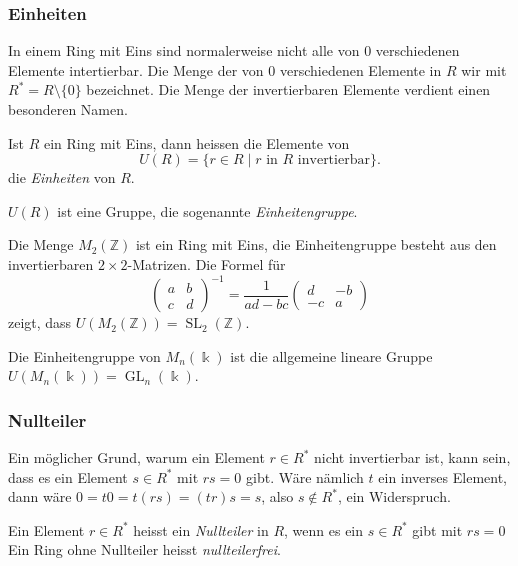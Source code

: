 \subsubsection{Einheiten}
In einem Ring mit Eins sind normalerweise nicht alle von $0$ verschiedenen
Elemente intertierbar.
Die Menge der von $0$ verschiedenen Elemente in $R$ wir mit $R^*=R\setminus\{0\}$
bezeichnet.
%
Die Menge der invertierbaren Elemente verdient einen besonderen Namen.

\begin{definition}
Ist $R$ ein Ring mit Eins, dann heissen die Elemente von
\[
U(R) = \{ r\in R \;|\; \text{$r$ in $R$ invertierbar}\}.
\]
die {\em Einheiten} von $R$.
%
\end{definition}

\begin{satz}
$U(R)$ ist eine Gruppe, die sogenannte {\em Einheitengruppe}.
%
\end{satz}

\begin{beispiel}
Die Menge $M_2(\mathbb{Z})$ ist ein Ring mit Eins, die Einheitengruppe
besteht aus den invertierbaren $2\times 2$-Matrizen. 
Die Formel für 
\[
\begin{pmatrix}
a&b\\
c&d
\end{pmatrix}^{-1}
=
\frac{1}{ad-bc}\begin{pmatrix}
d&-b\\
-c&a
\end{pmatrix}
\]
zeigt, dass $U(M_2(\mathbb{Z})) = \operatorname{SL}_2(\mathbb{Z})$.
\end{beispiel}

\begin{beispiel}
Die Einheitengruppe von $M_n(\Bbbk)$ ist die allgemeine lineare Gruppe 
$U(M_n(\Bbbk))=\operatorname{GL}_n(\Bbbk)$.
\end{beispiel}

\subsubsection{Nullteiler}
Ein möglicher Grund, warum ein Element $r\in R^*$ nicht invertierbar
ist, kann sein, dass es ein Element $s\in R^*$ mit $rs=0$ gibt.
Wäre nämlich $t$ ein inverses Element, dann wäre $0=t0 = t(rs) = (tr)s=s$,
also $s\not\in R^*$, ein Widerspruch.

\begin{definition}
\label{buch:grundlagen:def:nullteiler}
Ein Element $r\in R^*$ heisst ein {\em Nullteiler} in $R$,
wenn es ein $s\in R^*$ gibt mit $rs=0$
Ein Ring ohne Nullteiler heisst {\em nullteilerfrei}.
\end{definition}
%
%

